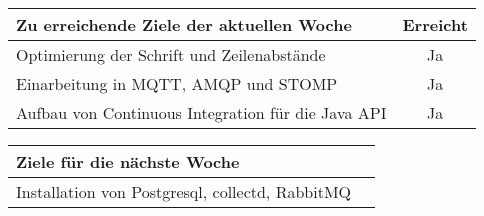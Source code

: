 \begin{tabularx}{\textwidth}{Xc}
    \arrayrulecolor{OliveGreen}
    \toprule
    {\bfseries Zu erreichende Ziele der aktuellen Woche} & {\bfseries Erreicht} \\
    \midrule[2pt]
    Optimierung der Schrift und Zeilenabstände           &Ja                    \\
    \rowcolor{OliveGreen!15}
    Einarbeitung in MQTT, AMQP und STOMP                 &Ja                    \\
    \rowcolor{White}
    Aufbau von Continuous Integration für die Java API   &Ja                    \\
    \bottomrule[2pt]
\end{tabularx}
%
\vspace{1cm}
%
\begin{tabularx}{\textwidth}{Xc}
    \arrayrulecolor{OliveGreen}
    \toprule
    {\bfseries Ziele für die nächste Woche}              &                      \\
    \midrule[2pt]
    Installation von Postgresql, collectd, RabbitMQ      &                      \\
\end{tabularx}
